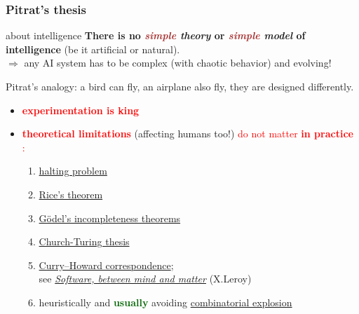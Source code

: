 \documentclass[xcolor=svgnames,final,smaller,a4]{beamer}
\begin{document}
 \begin{frame}
   \frametitle{Pitrat's thesis}
   \begin{block}{about intelligence}
     \textbf{There is no \emph{\textcolor{brown}{simple} theory} or \emph{\textcolor{brown}{simple} model} of intelligence} (be it artificial or natural).\\
     $\Rightarrow$ any AI system has to be complex (with chaotic behavior) and evolving!     
 \end{block}

 Pitrat's analogy: a bird can fly, an airplane also fly, they are
 designed differently.


 \begin{itemize}
 \item \textbf{\textcolor{red}{experimentation is king}}

 \item \textbf{\textcolor{red}{theoretical limitations}} (affecting humans too!) \textcolor{red}{do
   not matter \textbf{in practice} :}
   \begin{enumerate}
   \item \href{https://en.wikipedia.org/wiki/Halting_problem}{halting problem}
   \item \href{https://en.wikipedia.org/wiki/Rice\%27s_theorem}{Rice's theorem}
   \item \href{https://en.wikipedia.org/wiki/Gödel's_incompleteness_theorems}{Gödel's incompleteness theorems}

   \item \href{https://en.wikipedia.org/wiki/Church–Turing_thesis}{Church-Turing thesis}

   \item \href{https://en.wikipedia.org/wiki/Curry–Howard_correspondence}{Curry–Howard correspondence}; \\
     see {\href{https://xavierleroy.org/}{\textit{Software, between mind and matter}}} (X.Leroy)

   \item heuristically and \textbf{\textcolor{DarkGreen}{usually}} avoiding \href{https://en.wikipedia.org/wiki/Combinatorial_explosion}{combinatorial explosion}
     
   \end{enumerate}
   
 \end{itemize}
 \end{frame}
\end{document}
